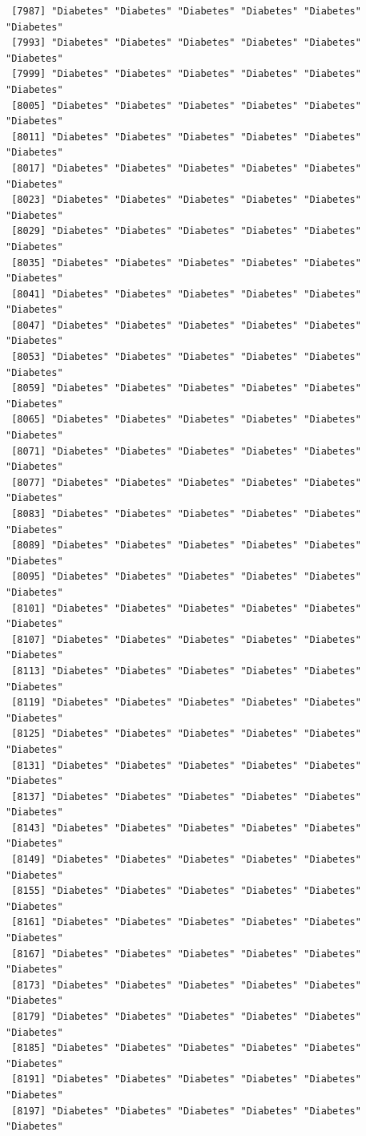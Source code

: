 \documentclass[
  letterpaper,
  DIV=11,
  numbers=noendperiod]{scrartcl}
\begin{document}
\begin{verbatim}
 [7987] "Diabetes" "Diabetes" "Diabetes" "Diabetes" "Diabetes" "Diabetes"
 [7993] "Diabetes" "Diabetes" "Diabetes" "Diabetes" "Diabetes" "Diabetes"
 [7999] "Diabetes" "Diabetes" "Diabetes" "Diabetes" "Diabetes" "Diabetes"
 [8005] "Diabetes" "Diabetes" "Diabetes" "Diabetes" "Diabetes" "Diabetes"
 [8011] "Diabetes" "Diabetes" "Diabetes" "Diabetes" "Diabetes" "Diabetes"
 [8017] "Diabetes" "Diabetes" "Diabetes" "Diabetes" "Diabetes" "Diabetes"
 [8023] "Diabetes" "Diabetes" "Diabetes" "Diabetes" "Diabetes" "Diabetes"
 [8029] "Diabetes" "Diabetes" "Diabetes" "Diabetes" "Diabetes" "Diabetes"
 [8035] "Diabetes" "Diabetes" "Diabetes" "Diabetes" "Diabetes" "Diabetes"
 [8041] "Diabetes" "Diabetes" "Diabetes" "Diabetes" "Diabetes" "Diabetes"
 [8047] "Diabetes" "Diabetes" "Diabetes" "Diabetes" "Diabetes" "Diabetes"
 [8053] "Diabetes" "Diabetes" "Diabetes" "Diabetes" "Diabetes" "Diabetes"
 [8059] "Diabetes" "Diabetes" "Diabetes" "Diabetes" "Diabetes" "Diabetes"
 [8065] "Diabetes" "Diabetes" "Diabetes" "Diabetes" "Diabetes" "Diabetes"
 [8071] "Diabetes" "Diabetes" "Diabetes" "Diabetes" "Diabetes" "Diabetes"
 [8077] "Diabetes" "Diabetes" "Diabetes" "Diabetes" "Diabetes" "Diabetes"
 [8083] "Diabetes" "Diabetes" "Diabetes" "Diabetes" "Diabetes" "Diabetes"
 [8089] "Diabetes" "Diabetes" "Diabetes" "Diabetes" "Diabetes" "Diabetes"
 [8095] "Diabetes" "Diabetes" "Diabetes" "Diabetes" "Diabetes" "Diabetes"
 [8101] "Diabetes" "Diabetes" "Diabetes" "Diabetes" "Diabetes" "Diabetes"
 [8107] "Diabetes" "Diabetes" "Diabetes" "Diabetes" "Diabetes" "Diabetes"
 [8113] "Diabetes" "Diabetes" "Diabetes" "Diabetes" "Diabetes" "Diabetes"
 [8119] "Diabetes" "Diabetes" "Diabetes" "Diabetes" "Diabetes" "Diabetes"
 [8125] "Diabetes" "Diabetes" "Diabetes" "Diabetes" "Diabetes" "Diabetes"
 [8131] "Diabetes" "Diabetes" "Diabetes" "Diabetes" "Diabetes" "Diabetes"
 [8137] "Diabetes" "Diabetes" "Diabetes" "Diabetes" "Diabetes" "Diabetes"
 [8143] "Diabetes" "Diabetes" "Diabetes" "Diabetes" "Diabetes" "Diabetes"
 [8149] "Diabetes" "Diabetes" "Diabetes" "Diabetes" "Diabetes" "Diabetes"
 [8155] "Diabetes" "Diabetes" "Diabetes" "Diabetes" "Diabetes" "Diabetes"
 [8161] "Diabetes" "Diabetes" "Diabetes" "Diabetes" "Diabetes" "Diabetes"
 [8167] "Diabetes" "Diabetes" "Diabetes" "Diabetes" "Diabetes" "Diabetes"
 [8173] "Diabetes" "Diabetes" "Diabetes" "Diabetes" "Diabetes" "Diabetes"
 [8179] "Diabetes" "Diabetes" "Diabetes" "Diabetes" "Diabetes" "Diabetes"
 [8185] "Diabetes" "Diabetes" "Diabetes" "Diabetes" "Diabetes" "Diabetes"
 [8191] "Diabetes" "Diabetes" "Diabetes" "Diabetes" "Diabetes" "Diabetes"
 [8197] "Diabetes" "Diabetes" "Diabetes" "Diabetes" "Diabetes" "Diabetes"

\end{verbatim}
\end{document}
